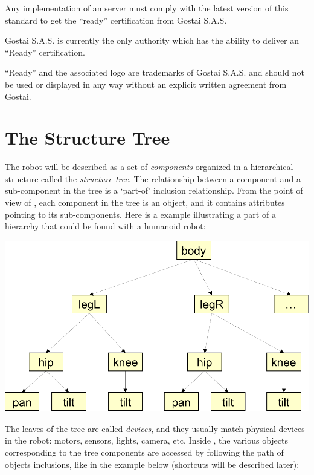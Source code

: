 \begin{center}
\end{center}

Any implementation of an \urbi server must comply with the latest version
of this standard to get the ``\urbi ready''
certification from Gostai S.A.S.


Gostai S.A.S. is currently the only authority which has the ability to
deliver an ``\urbi Ready'' certification.

``\urbi Ready'' and the associated logo are trademarks of Gostai
S.A.S. and should not be used or displayed in any way without an
explicit written agreement from Gostai.

\section{The Structure Tree}

The robot will be described as a set of
\textit{components} organized in a hierarchical
structure called the \textit{structure tree}. The
relationship between a component and a sub-component in the tree is a
‘part-of’ inclusion relationship. From the point of view of \urbi, each
component in the tree is an object, and it contains attributes pointing
to its sub-components. Here is a example illustrating a part of a
hierarchy that could be found with a humanoid robot:

\begin{center}
  \includegraphics[width=.8\linewidth]{img/structure-tree}
\end{center}

The leaves of the tree are called
\textit{devices}, and they usually match physical
devices in the robot: motors, sensors, lights, camera, etc. Inside
\urbi, the various objects corresponding to the tree components are
accessed by following the path of objects inclusions, like in the
example below (shortcuts will be described later):


